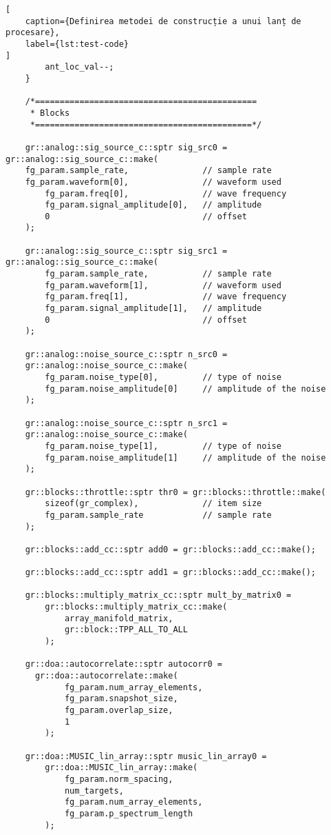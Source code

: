\begin{lstlisting}[
    caption={Definirea metodei de construcție a unui lanț de procesare},
    label={lst:test-code}
]
        ant_loc_val--;
    }

    /*=============================================
     * Blocks
     *============================================*/

    gr::analog::sig_source_c::sptr sig_src0 = gr::analog::sig_source_c::make(
    fg_param.sample_rate,               // sample rate
    fg_param.waveform[0],               // waveform used
        fg_param.freq[0],               // wave frequency
        fg_param.signal_amplitude[0],   // amplitude
        0                               // offset
    );

    gr::analog::sig_source_c::sptr sig_src1 = gr::analog::sig_source_c::make(
        fg_param.sample_rate,           // sample rate
        fg_param.waveform[1],           // waveform used
        fg_param.freq[1],               // wave frequency
        fg_param.signal_amplitude[1],   // amplitude
        0                               // offset
    );

    gr::analog::noise_source_c::sptr n_src0 =
    gr::analog::noise_source_c::make(
        fg_param.noise_type[0],         // type of noise
        fg_param.noise_amplitude[0]     // amplitude of the noise
    );

    gr::analog::noise_source_c::sptr n_src1 =
    gr::analog::noise_source_c::make(
        fg_param.noise_type[1],         // type of noise
        fg_param.noise_amplitude[1]     // amplitude of the noise
    );

    gr::blocks::throttle::sptr thr0 = gr::blocks::throttle::make(
        sizeof(gr_complex),             // item size
        fg_param.sample_rate            // sample rate
    );

    gr::blocks::add_cc::sptr add0 = gr::blocks::add_cc::make();

    gr::blocks::add_cc::sptr add1 = gr::blocks::add_cc::make();

    gr::blocks::multiply_matrix_cc::sptr mult_by_matrix0 =
        gr::blocks::multiply_matrix_cc::make(
            array_manifold_matrix,
            gr::block::TPP_ALL_TO_ALL
        );

    gr::doa::autocorrelate::sptr autocorr0 =
      gr::doa::autocorrelate::make(
            fg_param.num_array_elements,
            fg_param.snapshot_size,
            fg_param.overlap_size,
            1
        );

    gr::doa::MUSIC_lin_array::sptr music_lin_array0 =
        gr::doa::MUSIC_lin_array::make(
            fg_param.norm_spacing,
            num_targets,
            fg_param.num_array_elements,
            fg_param.p_spectrum_length
        );


\end{lstlisting}

